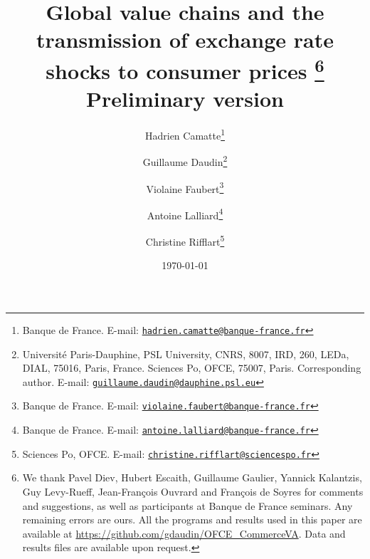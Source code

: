 \documentclass[11pt,a4paper]{article}
\newcommand{\email}[1]{\href{mailto:#1}{\nolinkurl{#1}}}
\begin{document}
\title{Global value chains and the transmission of exchange rate shocks to consumer prices	\thanks{We thank Pavel Diev, Hubert Escaith, Guillaume Gaulier, Yannick Kalantzis, Guy Levy-Rueff, Jean-François Ouvrard and François de Soyres for comments and suggestions, as well as participants at Banque de France seminars. Any remaining errors are ours. All the programs and results used in this paper are available at \url{https://github.com/gdaudin/OFCE_CommerceVA}. Data and results files are available upon request.}\\
\vspace{1cm}
\normalsize{Preliminary version}
}
\vspace{1cm}
\date{\today}
\author{
	Hadrien Camatte\thanks{Banque de France. E-mail: \email{hadrien.camatte@banque-france.fr}}
	\and
	Guillaume Daudin\thanks{Université Paris-Dauphine, PSL University, CNRS, 8007, IRD, 260, LEDa, DIAL, 75016, Paris, France. Sciences Po, OFCE, 75007, Paris. Corresponding author. E-mail: \email{guillaume.daudin@dauphine.psl.eu}}
	\and
	Violaine Faubert\thanks{Banque de France. E-mail: \email{violaine.faubert@banque-france.fr}}
	\and
	Antoine Lalliard\thanks{Banque de France. E-mail: \email{antoine.lalliard@banque-france.fr}}
	\and
	Christine Rifflart\thanks{Sciences Po, OFCE. E-mail: \email{christine.rifflart@sciencespo.fr}}
}
\maketitle
\end{document}
